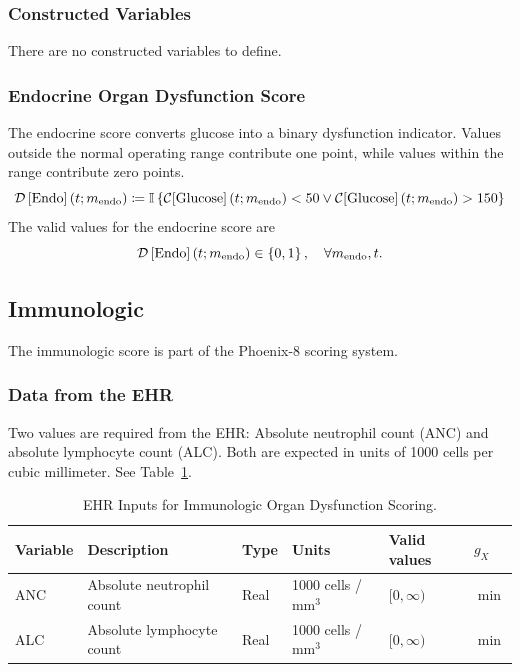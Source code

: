 \documentclass[letterpaper,10pt]{article}
\begin{document}
\subsubsection{Constructed Variables}\label{sec:endo-constructed}
There are no constructed variables to define.

\subsubsection{Endocrine Organ Dysfunction Score}\label{sec:endo-score}
The endocrine score converts glucose into a binary dysfunction indicator. Values
outside the normal operating range contribute one point, while values within the
range contribute zero points.
\begin{equation}
  \label{eq:endo}
  \DS{Endo}[\m{endo}] \coloneqq
  \mathbb{I}\left\{\CF{Glucose}[\m{endo}] < 50 \vee \CF{Glucose}[\m{endo}] > 150 \right\}
\end{equation}
The valid values for the endocrine score are
\begin{equation}
  \label{eq:endo-valid-values}
  \DS{Endo}[\m{endo}] \in \left\{0, 1\right\}, \quad
  \forall \m{endo}, t.
\end{equation}

\subsection{Immunologic}\label{sec:immu}
The immunologic score is part of the Phoenix-8 scoring system.

\subsubsection{Data from the EHR}\label{sec:immu-ehr}
Two values are required from the EHR: Absolute neutrophil count (ANC) and
absolute lymphocyte count (ALC).  Both are expected in units of 1000 cells per
cubic millimeter. See Table~\ref{tab:immu-ehr}.

\begin{table}
  \centering
  \caption{EHR Inputs for Immunologic Organ Dysfunction Scoring.}
  \label{tab:immu-ehr}
  \small
  \begin{tabular}{llllll}
    \toprule
    \textbf{Variable} &
    \textbf{Description} &
    \textbf{Type} &
    \textbf{Units} &
    \textbf{Valid values} &
    \textbf{$g_X$} \\
    \midrule

    \rowcolor{gray!20}
    ANC &
    Absolute neutrophil count &
    Real &
    1000 cells / mm$^3$ &
    $[0, \infty)$ &
    $\min$ \\
    ALC &
    Absolute lymphocyte count &
    Real &
    1000 cells / mm$^3$ &
    $[0, \infty)$ &
    $\min$ \\
    \bottomrule
  \end{tabular}
\end{table}
\end{document}
